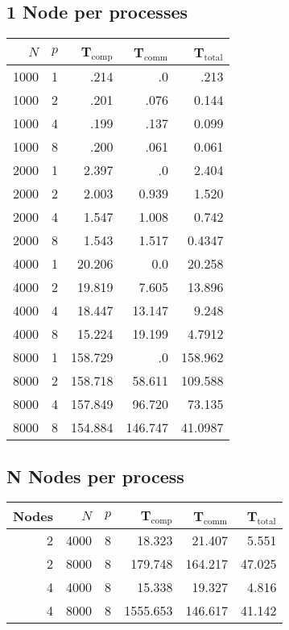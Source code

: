 \documentclass[11pt]{article}
\begin{document}
\subsection{1 Node per processes}
\label{sec:org543a032}

\begin{center}
\begin{tabular}{rrrrr}
\(N\) & \(p\) & T\(_{\text{comp}}\) & T\(_{\text{comm}}\) & T\(_{\text{total}}\)\\
\hline
1000 & 1 & .214 & .0 & .213\\
1000 & 2 & .201 & .076 & 0.144\\
1000 & 4 & .199 & .137 & 0.099\\
1000 & 8 & .200 & .061 & 0.061\\
2000 & 1 & 2.397 & .0 & 2.404\\
2000 & 2 & 2.003 & 0.939 & 1.520\\
2000 & 4 & 1.547 & 1.008 & 0.742\\
2000 & 8 & 1.543 & 1.517 & 0.4347\\
4000 & 1 & 20.206 & 0.0 & 20.258\\
4000 & 2 & 19.819 & 7.605 & 13.896\\
4000 & 4 & 18.447 & 13.147 & 9.248\\
4000 & 8 & 15.224 & 19.199 & 4.7912\\
8000 & 1 & 158.729 & .0 & 158.962\\
8000 & 2 & 158.718 & 58.611 & 109.588\\
8000 & 4 & 157.849 & 96.720 & 73.135\\
8000 & 8 & 154.884 & 146.747 & 41.0987\\
\end{tabular}
\end{center}



\subsection{N Nodes per process}
\label{sec:orgdd92529}



\begin{center}
\begin{tabular}{rrrrrr}
Nodes & \(N\) & \(p\) & T\(_{\text{comp}}\) & T\(_{\text{comm}}\) & T\(_{\text{total}}\)\\
\hline
2 & 4000 & 8 & 18.323 & 21.407 & 5.551\\
2 & 8000 & 8 & 179.748 & 164.217 & 47.025\\
4 & 4000 & 8 & 15.338 & 19.327 & 4.816\\
4 & 8000 & 8 & 1555.653 & 146.617 & 41.142\\
\end{tabular}
\end{center}
\end{document}
